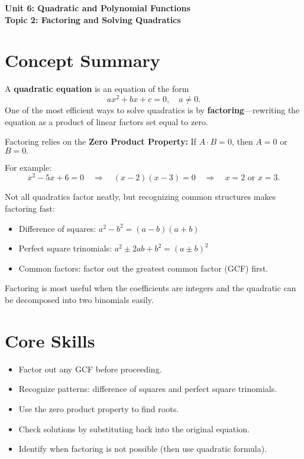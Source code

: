 \documentclass[12pt]{article}
\begin{document}
\begin{center}
    \LARGE \textbf{Unit 6: Quadratic and Polynomial Functions} \\[6pt]
    \Large \textbf{Topic 2: Factoring and Solving Quadratics}
\end{center}

\vspace{1em}

\section*{Concept Summary}

A \textbf{quadratic equation} is an equation of the form
\[
ax^2 + bx + c = 0, \quad a \ne 0.
\]
One of the most efficient ways to solve quadratics is by \textbf{factoring}—rewriting the equation as a product of linear factors set equal to zero.

Factoring relies on the \textbf{Zero Product Property:}  
If \(A \cdot B = 0\), then \(A = 0\) or \(B = 0.\)

For example:
\[
x^2 - 5x + 6 = 0 \quad \Rightarrow \quad (x - 2)(x - 3) = 0 \quad \Rightarrow \quad x = 2 \text{ or } x = 3.
\]

Not all quadratics factor neatly, but recognizing common structures makes factoring fast:
\begin{itemize}
  \item Difference of squares: \(a^2 - b^2 = (a - b)(a + b)\)
  \item Perfect square trinomials: \(a^2 \pm 2ab + b^2 = (a \pm b)^2\)
  \item Common factors: factor out the greatest common factor (GCF) first.
\end{itemize}

Factoring is most useful when the coefficients are integers and the quadratic can be decomposed into two binomials easily.

\section*{Core Skills}
\begin{itemize}
  \item Factor out any GCF before proceeding.
  \item Recognize patterns: difference of squares and perfect square trinomials.
  \item Use the zero product property to find roots.
  \item Check solutions by substituting back into the original equation.
  \item Identify when factoring is not possible (then use quadratic formula).
\end{itemize}
\end{document}
